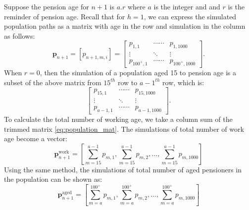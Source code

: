 \documentclass[11pt,a4paper,]{article}
\begin{document}
Suppose the pension age for \(n+1\) is \(a.r\) where \(a\) is the integer and and \(r\) is the reminder of pension age. Recall that for \(h=1\), we can express the simulated population paths as a matrix with age in the row and simulation in the column as follows:
\begin{equation*}
  \bm{p}_{n+1}=[p_{n+1,m,i}] =
    \begin{bmatrix}
       p_{1,1} & \cdots\cdots & p_{1,1000} \\
      \vdots & \ddots & \vdots \\
      p_{100^+,1} & \cdots\cdots &p_{100^+,1000}
      \end{bmatrix}.
\end{equation*}
When \(r=0\), then the simulation of a population aged 15 to pension age is a subset of the above matrix from \(15^{th}\) row to \(a-1^{th}\) row, which is:
\begin{equation}
  \begin{bmatrix}
    p_{15,1} & \cdots\cdots & p_{15,1000} \\
    \vdots & \ddots & \vdots \\
    p_{a-1,1} & \cdots\cdots &p_{a-1,1000}
  \end{bmatrix}. \label{eq:population_mat}
\end{equation}
To calculate the total number of working age, we take a column sum of the trimmed matrix \eqref{eq:population_mat}. The simulations of total number of work age become a vector:
\begin{equation}
  \bm{p}^{\text{work}}_{n+1} = \left[\sum_{m=15}^{a-1}p_{m,1},\sum_{m=15}^{a-1}p_{m,2},\dots,\sum_{m=15}^{a-1}p_{m,1000}\right] \label{eq:work}
\end{equation}
Using the same method, the simulations of total number of aged pensioners in the population can be shown as:
\begin{equation}
  \bm{p}^{\text{aged}}_{n+1} = \left[\sum_{m=a}^{100^+}p_{m,1},\sum_{m=a}^{100^+}p_{m,2},\dots,\sum_{m=a}^{100^+}p_{m,1000}\right]\label{eq:aged}
\end{equation}
\end{document}
